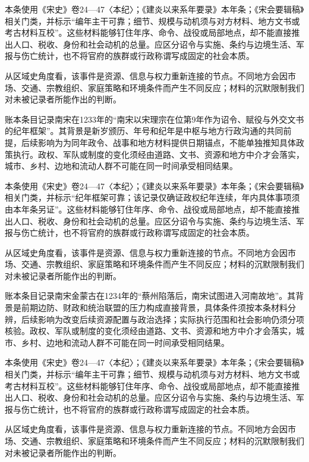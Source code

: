 本条使用《宋史》卷24—47〈本纪〉；《建炎以来系年要录》本年条；《宋会要辑稿》相关门类，并标示“编年主干可靠；细节、规模与动机须与对方材料、地方文书或考古材料互校”。这些材料能够钉住年序、命令、战役或局部地点，却不能直接推出人口、税收、身份和社会动机的总量。应区分诏令与实施、条约与边境生活、军报与伤亡统计，也不将官府的族群或行政称谓写成固定的社会本质。

从区域史角度看，该事件是资源、信息与权力重新连接的节点。不同地方会因市场、交通、宗教组织、家庭策略和环境条件而产生不同反应；材料的沉默限制我们对未被记录者所能作出的判断。

账本条目记录南宋在1233年的“南宋以宋理宗在位第9年作为诏令、赋役与外交文书的纪年框架”。其背景是新岁颁历、年号和纪年是中枢与地方行政沟通的共同前提，后续影响为为同年政令、战事和地方材料提供日期锚点，不能单独推知具体政策执行。政权、军队或制度的变化须经由道路、文书、资源和地方中介才会落实，城市、乡村、边地和流动人群不可能在同一时间承受相同结果。

本条使用《宋史》卷24—47〈本纪〉；《建炎以来系年要录》本年条；《宋会要辑稿》相关门类，并标示“纪年框架可靠；该记录仅确证政权纪年连续，年内具体事项须由本年条另证”。这些材料能够钉住年序、命令、战役或局部地点，却不能直接推出人口、税收、身份和社会动机的总量。应区分诏令与实施、条约与边境生活、军报与伤亡统计，也不将官府的族群或行政称谓写成固定的社会本质。

从区域史角度看，该事件是资源、信息与权力重新连接的节点。不同地方会因市场、交通、宗教组织、家庭策略和环境条件而产生不同反应；材料的沉默限制我们对未被记录者所能作出的判断。

账本条目记录南宋金蒙古在1234年的“蔡州陷落后，南宋试图进入河南故地”。其背景是前期边防、财政和统治联盟的压力构成直接背景，具体条件须按本条材料分辨，后续影响为改变后续资源配置与政治选择；实际执行范围和社会影响仍须分项核验。政权、军队或制度的变化须经由道路、文书、资源和地方中介才会落实，城市、乡村、边地和流动人群不可能在同一时间承受相同结果。

本条使用《宋史》卷24—47〈本纪〉；《建炎以来系年要录》本年条；《宋会要辑稿》相关门类，并标示“编年主干可靠；细节、规模与动机须与对方材料、地方文书或考古材料互校”。这些材料能够钉住年序、命令、战役或局部地点，却不能直接推出人口、税收、身份和社会动机的总量。应区分诏令与实施、条约与边境生活、军报与伤亡统计，也不将官府的族群或行政称谓写成固定的社会本质。

从区域史角度看，该事件是资源、信息与权力重新连接的节点。不同地方会因市场、交通、宗教组织、家庭策略和环境条件而产生不同反应；材料的沉默限制我们对未被记录者所能作出的判断。
